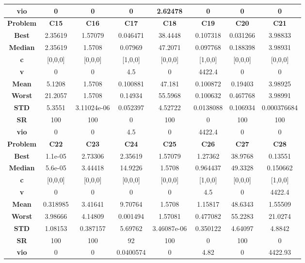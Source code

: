 \documentclass{IEEEtran}
\begin{document}
\begin{center}
\begin{tabular}{|c|c|c|c|c|c|c|c|}
    \textbf{vio} & 0 & 0 & 0 & 2.62478 & 0 & 0 & 0\\ 
    \hline 
    \hline 
    \textbf{Problem} & \textbf{C15} & \textbf{C16} & \textbf{C17} & \textbf{C18} & \textbf{C19} & \textbf{C20} & \textbf{C21} \\ 
    \hline\hline 
    \textbf{Best} & 2.35619 & 1.57079 & 0.046471 & 38.4448 & 0.107318 & 0.031266 & 3.98833\\ 
    \textbf{Median} & 2.35619 & 1.5708 & 0.07969 & 47.2071 & 0.097768 & 0.188398 & 3.98931\\ 
    \textbf{c} & [0,0,0] & [0,0,0] & [1,0,0] & [0,0,0] & [1,0,0] & [0,0,0] & [0,0,0]\\ 
    \textbf{v} & 0 & 0 & 4.5 & 0 & 4422.4 & 0 & 0\\ 
    \textbf{Mean} & 5.1208 & 1.5708 & 0.100881 & 47.181 & 0.100872 & 0.19403 & 3.98925\\ 
    \textbf{Worst} & 21.2057 & 1.5708 & 0.14934 & 55.5968 & 0.100632 & 0.467768 & 3.98991\\ 
    \textbf{STD} & 5.3551 & 3.11024e-06 & 0.052397 & 4.52722 & 0.0138088 & 0.106934 & 0.000376684\\ 
    \textbf{SR} & 100 & 100 & 0 & 100 & 0 & 100 & 100\\ 
    \textbf{vio} & 0 & 0 & 4.5 & 0 & 4422.4 & 0 & 0\\ 
    \hline 
    \hline 
    \textbf{Problem} & \textbf{C22} & \textbf{C23} & \textbf{C24} & \textbf{C25} & \textbf{C26} & \textbf{C27} & \textbf{C28} \\ 
    \hline\hline 
    \textbf{Best} & 1.1e-05 & 2.73306 & 2.35619 & 1.57079 & 1.27362 & 38.9768 & 0.13551\\ 
    \textbf{Median} & 5.6e-05 & 3.44418 & 14.9226 & 1.5708 & 0.964437 & 49.3328 & 0.150662\\ 
    \textbf{c} & [0,0,0] & [0,0,0] & [0,0,0] & [0,0,0] & [1,0,0] & [0,0,0] & [1,0,0]\\ 
    \textbf{v} & 0 & 0 & 0 & 0 & 4.5 & 0 & 4422.4\\ 
    \textbf{Mean} & 0.318985 & 3.41641 & 9.70764 & 1.5708 & 1.15817 & 48.6343 & 1.55509\\ 
    \textbf{Worst} & 3.98666 & 4.14809 & 0.001494 & 1.57081 & 0.477082 & 55.2283 & 21.0274\\ 
    \textbf{STD} & 1.08153 & 0.387157 & 5.69762 & 3.46087e-06 & 0.350122 & 4.64097 & 4.8842\\ 
    \textbf{SR} & 100 & 100 & 92 & 100 & 0 & 100 & 0\\ 
    \textbf{vio} & 0 & 0 & 0.0400574 & 0 & 4.82 & 0 & 4422.93\\ 
    \hline 
  \end{tabular}
\end{center}
\newpage
\end{document}

